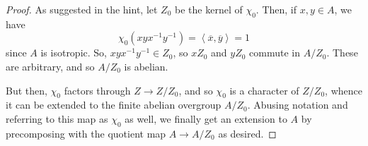 \begin{proof}
	As suggested in the hint, let $Z_0$ be the kernel of $\chi_0$. Then, if $x,y \in A$, we have
	\[ \chi_0(xyx^{-1}y^{-1}) = \left<\overline{x},\overline{y}\right> = 1 \]
	since $A$ is isotropic. So, $xyx^{-1}y^{-1} \in Z_0$, so $xZ_0$ and $yZ_0$ commute in $A/Z_0$. These are arbitrary, and so $A/Z_0$ is abelian.
	
	But then, $\chi_0$ factors through $Z \to Z/Z_0$, and so $\chi_0$ is a character of $Z/Z_0$, whence it can be extended to the finite abelian overgroup $A/Z_0$. Abusing notation and referring to this map as $\chi_0$ as well, we finally get an extension to $A$ by precomposing with the quotient map $A \to A/Z_0$ as desired.
\end{proof}
